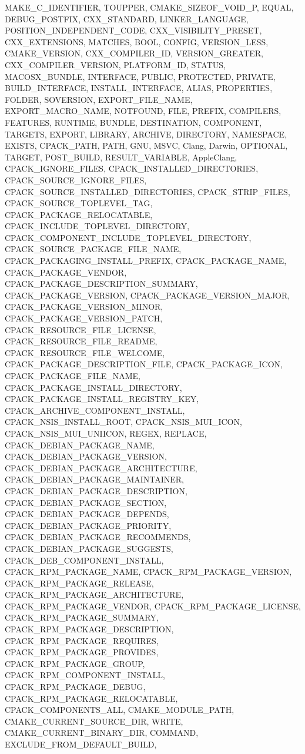 {{						MAKE_C_IDENTIFIER, TOUPPER, CMAKE_SIZEOF_VOID_P, EQUAL, DEBUG_POSTFIX, CXX_STANDARD, LINKER_LANGUAGE,
						POSITION_INDEPENDENT_CODE, CXX_VISIBILITY_PRESET, CXX_EXTENSIONS, MATCHES, BOOL, CONFIG,
						VERSION_LESS, CMAKE_VERSION, CXX_COMPILER_ID, VERSION_GREATER, CXX_COMPILER_VERSION,
						PLATFORM_ID, STATUS, MACOSX_BUNDLE, INTERFACE, PUBLIC, PROTECTED, PRIVATE, BUILD_INTERFACE,
						INSTALL_INTERFACE, ALIAS, PROPERTIES, FOLDER, SOVERSION, EXPORT_FILE_NAME, EXPORT_MACRO_NAME,
						NOTFOUND, FILE, PREFIX, COMPILERS, FEATURES, RUNTIME, BUNDLE, DESTINATION, COMPONENT,
						TARGETS, EXPORT, LIBRARY, ARCHIVE, DIRECTORY, NAMESPACE, EXISTS, CPACK_PATH, PATH, GNU, MSVC, Clang,
						Darwin, OPTIONAL, TARGET, POST_BUILD, RESULT_VARIABLE, AppleClang,
						CPACK_IGNORE_FILES, CPACK_INSTALLED_DIRECTORIES, CPACK_SOURCE_IGNORE_FILES,
						CPACK_SOURCE_INSTALLED_DIRECTORIES, CPACK_STRIP_FILES, CPACK_SOURCE_TOPLEVEL_TAG,
						CPACK_PACKAGE_RELOCATABLE, CPACK_INCLUDE_TOPLEVEL_DIRECTORY,
						CPACK_COMPONENT_INCLUDE_TOPLEVEL_DIRECTORY, CPACK_SOURCE_PACKAGE_FILE_NAME,
						CPACK_PACKAGING_INSTALL_PREFIX, CPACK_PACKAGE_NAME, CPACK_PACKAGE_VENDOR,
						CPACK_PACKAGE_DESCRIPTION_SUMMARY, CPACK_PACKAGE_VERSION, CPACK_PACKAGE_VERSION_MAJOR,
						CPACK_PACKAGE_VERSION_MINOR, CPACK_PACKAGE_VERSION_PATCH, CPACK_RESOURCE_FILE_LICENSE,
						CPACK_RESOURCE_FILE_README, CPACK_RESOURCE_FILE_WELCOME, CPACK_PACKAGE_DESCRIPTION_FILE,
						CPACK_PACKAGE_ICON, CPACK_PACKAGE_FILE_NAME, CPACK_PACKAGE_INSTALL_DIRECTORY,
						CPACK_PACKAGE_INSTALL_REGISTRY_KEY, CPACK_ARCHIVE_COMPONENT_INSTALL,
						CPACK_NSIS_INSTALL_ROOT, CPACK_NSIS_MUI_ICON, CPACK_NSIS_MUI_UNIICON, REGEX, REPLACE, 
						CPACK_DEBIAN_PACKAGE_NAME, CPACK_DEBIAN_PACKAGE_VERSION, CPACK_DEBIAN_PACKAGE_ARCHITECTURE,
						CPACK_DEBIAN_PACKAGE_MAINTAINER, CPACK_DEBIAN_PACKAGE_DESCRIPTION, CPACK_DEBIAN_PACKAGE_SECTION,
						CPACK_DEBIAN_PACKAGE_DEPENDS, CPACK_DEBIAN_PACKAGE_PRIORITY, CPACK_DEBIAN_PACKAGE_RECOMMENDS,
						CPACK_DEBIAN_PACKAGE_SUGGESTS, CPACK_DEB_COMPONENT_INSTALL, CPACK_RPM_PACKAGE_NAME,
						CPACK_RPM_PACKAGE_VERSION, CPACK_RPM_PACKAGE_RELEASE, CPACK_RPM_PACKAGE_ARCHITECTURE,
						CPACK_RPM_PACKAGE_VENDOR, CPACK_RPM_PACKAGE_LICENSE, CPACK_RPM_PACKAGE_SUMMARY,
						CPACK_RPM_PACKAGE_DESCRIPTION, CPACK_RPM_PACKAGE_REQUIRES, CPACK_RPM_PACKAGE_PROVIDES,
						CPACK_RPM_PACKAGE_GROUP, CPACK_RPM_COMPONENT_INSTALL, CPACK_RPM_PACKAGE_DEBUG, CPACK_RPM_PACKAGE_RELOCATABLE,
						CPACK_COMPONENTS_ALL,
						CMAKE_MODULE_PATH, CMAKE_CURRENT_SOURCE_DIR, WRITE, CMAKE_CURRENT_BINARY_DIR, COMMAND, EXCLUDE_FROM_DEFAULT_BUILD,
}}
